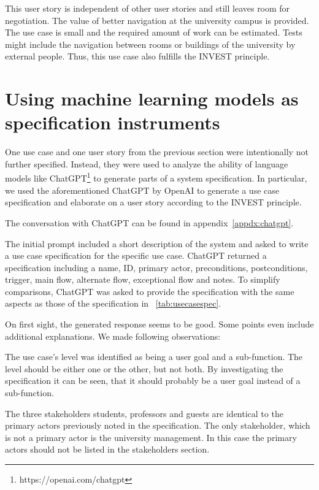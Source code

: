 \documentclass[article,onecolumn]{IEEEtran}
\begin{document}
This user story is independent of other user stories and still leaves room for negotiation. The value of better navigation at the university campus is provided.
The use case is small and the required amount of work can be estimated. Tests might include the navigation between rooms or buildings of the university by external people.
Thus, this use case also fulfills the INVEST principle.

\section{Using machine learning models as specification instruments} \label{sec:chatgpt}

One use case and one user story from the previous section were intentionally not further specified. Instead, they were used to analyze the ability of language models like ChatGPT\footnote{https://openai.com/chatgpt} to generate parts of a system specification.
In particular, we used the aforementioned ChatGPT by OpenAI to generate a use case specification and elaborate on a user story according to the INVEST principle.

The conversation with ChatGPT can be found in appendix~\ref{appdx:chatgpt}.


The initial prompt included a short description of the system and asked to write a use case specification for the specific use case.
ChatGPT returned a specification including a name, ID, primary actor, preconditions, postconditions, trigger, main flow, alternate flow, exceptional flow and notes.
To simplify comparisons, ChatGPT was asked to provide the specification with the same aspects as those of the specification in \tablename~\ref{tab:usecasespec}.

On first sight, the generated response seems to be good. Some points even include additional explanations. We made following observations:

The use case's level was identified as being a user goal and a sub-function. The level should be either one or the other, but not both. By investigating the specification it can be seen, that it should probably be a user goal instead of a sub-function.

The three stakeholders students, professors and guests are identical to the primary actors previously noted in the specification. The only stakeholder, which is not a primary actor is the university management. In this case the primary actors should not be listed in the stakeholders section.
\end{document}
